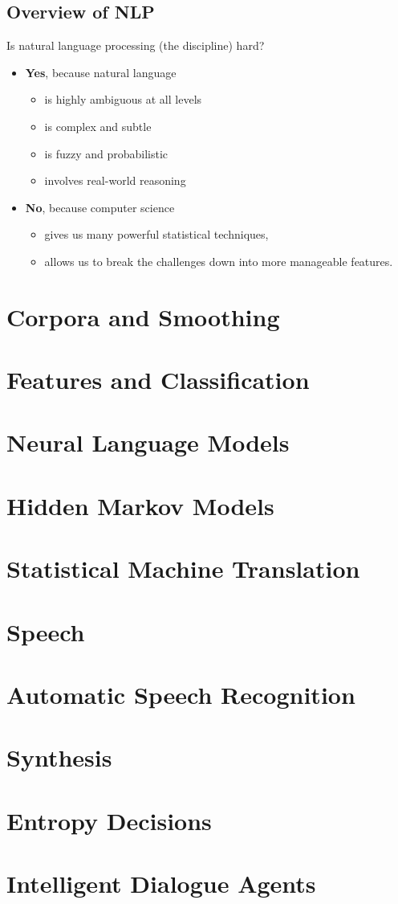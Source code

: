 \documentclass[11pt]{article}
\begin{document}
\subsection{Overview of NLP}
Is natural language processing (the discipline) hard?
\begin{itemize}
\item \textbf{Yes}, because natural language
\begin{itemize}
\item is highly ambiguous at all levels
\item is complex and subtle
\item is fuzzy and probabilistic
\item involves real-world reasoning
\end{itemize}
\item \textbf{No}, because computer science
\begin{itemize}
\item gives us many powerful statistical techniques,
\item allows us to break the challenges down into more
manageable features.
\end{itemize}

\end{itemize}



\pagebreak
\section{Corpora and Smoothing}
\section{Features and Classification}
\section{Neural Language Models}
\section{Hidden Markov Models}
\section{Statistical Machine Translation}
\section{Speech}
\section{Automatic Speech Recognition}
\section{Synthesis}
\section{Entropy Decisions}
\section{Intelligent Dialogue Agents}
\end{document}
